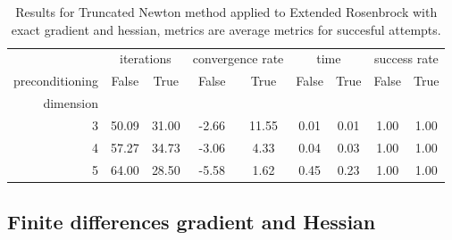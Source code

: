\begin{table}
\centering
\caption{Results for Truncated Newton method applied to Extended Rosenbrock with exact gradient and hessian, metrics are average metrics for succesful attempts.}
\label{tab:Truncated_Newton_Extended_Rosenbrock_exact}
\begin{tabular}{r|cc|cc|cc|cc}
\toprule
    & \multicolumn{2}{|c}{iterations} & \multicolumn{2}{|c}{convergence rate} & \multicolumn{2}{|c}{time} & \multicolumn{2}{|c}{success rate} \\
preconditioning & False & True & False & True & False & True & False & True \\
dimension &  &  &  &  &  &  &  &  \\
\midrule
3 & 50.09 & 31.00 & -2.66 & 11.55 & 0.01 & 0.01 & 1.00 & 1.00 \\
4 & 57.27 & 34.73 & -3.06 & 4.33 & 0.04 & 0.03 & 1.00 & 1.00 \\
5 & 64.00 & 28.50 & -5.58 & 1.62 & 0.45 & 0.23 & 1.00 & 1.00 \\
\bottomrule
\end{tabular}
\end{table}

\subsection{Finite differences gradient and Hessian}
\label{subsec:extended_rosenbrock_findiff}

